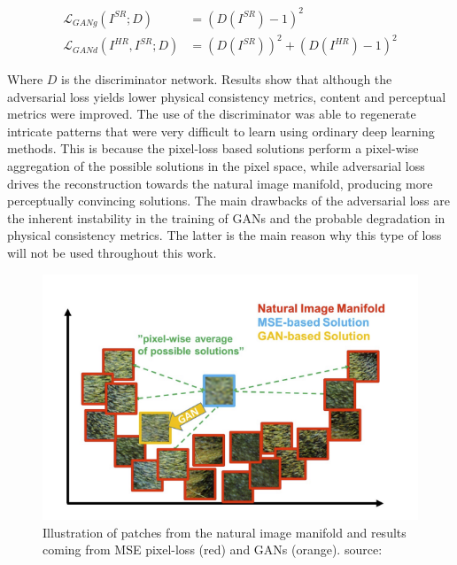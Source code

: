         \begin{equation}
            \begin{aligned}
            \mathcal{L}_{GANg}(I^{SR};D) &= (D(I^{SR}) - 1)^2 \\ 
            \mathcal{L}_{GANd}(I^{HR}, I^{SR};D) &= (D(I^{SR}))^2 + (D(I^{HR}) - 1)^2
            \end{aligned}
        \end{equation}

        Where $D$ is the discriminator network. 
        Results show that although the adversarial loss yields lower physical consistency metrics, content and perceptual metrics were improved. 
        The use of the discriminator was able to regenerate intricate patterns that were very difficult to learn using ordinary deep learning methods. 
        This is because the pixel-loss based solutions perform a pixel-wise aggregation of the possible solutions in the pixel space, while adversarial loss drives the reconstruction towards the natural image manifold, producing more perceptually convincing solutions. 
        The main drawbacks of the adversarial loss are the inherent instability in the training of GANs and the probable degradation in physical consistency metrics.
        The latter is the main reason why this type of loss will not be used throughout this work.

        \begin{figure}[H]
            \centering
            \includegraphics[width=\textwidth]{Includes/2-gans-natural-manifold.png}
            \caption{Illustration of patches from the natural image manifold and results coming from MSE pixel-loss (red) and GANs (orange). source:\cite{ledig2017photorealistic}}
            \label{fig:2-gans-natural-manifold}
        \end{figure}

















